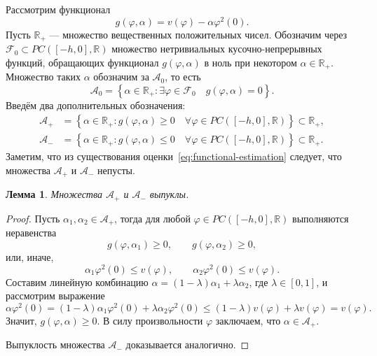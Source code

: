 \documentclass[a4paper,14pt]{article}
\newtheorem{lemma}{Лемма}
\theoremstyle{definition}
\begin{document}
Рассмотрим функционал
\begin{equation*}
  g(\varphi, \alpha) = v(\varphi) - \alpha \varphi^2(0).
\end{equation*}
Пусть $\mathbb{R}_+$ --- множество вещественных положительных чисел.
Обозначим через $\mathcal{F}_0 \subset PC([-h, 0], \mathbb{R})$ множество нетривиальных
кусочно-непрерывных функций, обращающих функционал $g(\varphi, \alpha)$ в ноль при некотором
$\alpha \in \mathbb{R}_+$. Множество таких $\alpha$ обозначим за $\mathcal{A}_0$, то есть
\begin{equation*}
  \mathcal{A}_0 = \left\{
    \alpha \in \mathbb{R}_+: \exists \varphi \in \mathcal{F}_0 \quad g(\varphi, \alpha) = 0
  \right\}.
\end{equation*}
Введём два дополнительных обозначения:
\begin{equation*}
  \begin{aligned}
    \mathcal{A}_+
    &=
      \left\{
      \alpha \in \mathbb{R}_+ :
      g(\varphi, \alpha) \geqslant 0 \quad \forall \varphi \in PC([-h, 0], \mathbb{R})
      \right\} \subset \mathbb{R}_+, \\
    \mathcal{A}_-
    &=
      \left\{
      \alpha \in \mathbb{R}_+ :
      g(\varphi, \alpha) \leqslant 0 \quad \forall \varphi \in PC([-h, 0], \mathbb{R})
      \right\} \subset \mathbb{R}_+.
  \end{aligned}
\end{equation*}
Заметим, что из существования оценки~\eqref{eq:functional-estimation} следует, что
множества $\mathcal{A}_+$ и $\mathcal{A}_-$ непусты.

\begin{lemma}
  Множества $\mathcal{A}_+$ и $\mathcal{A}_-$ выпуклы.
\end{lemma}

\begin{proof}
  Пусть $\alpha_1, \alpha_2 \in \mathcal{A}_+$, тогда для любой
  $\varphi \in PC([-h, 0], \mathbb{R})$ выполняются неравенства
  \begin{equation*}
      g(\varphi, \alpha_1) \geqslant 0, \qquad
      g(\varphi, \alpha_2) \geqslant 0,
  \end{equation*}
  или, иначе,
  \begin{equation*}
    \alpha_1 \varphi^2(0) \leqslant v(\varphi),
    \qquad
    \alpha_2 \varphi^2(0) \leqslant v(\varphi).
  \end{equation*}
  Составим линейную комбинацию $\alpha = (1 - \lambda) \alpha_1 + \lambda \alpha_2$,
  где $\lambda \in [0, 1]$, и рассмотрим выражение
  \begin{equation*}
    \alpha \varphi^2(0)
    =
    (1 - \lambda) \alpha_1 \varphi^2(0) + \lambda \alpha_2 \varphi^2(0)
    \leqslant
    (1 - \lambda) v(\varphi) + \lambda v(\varphi)
    = v(\varphi).
  \end{equation*}
  Значит, $g(\varphi, \alpha) \geqslant 0$. В силу произвольности $\varphi$ заключаем,
  что $\alpha \in \mathcal{A}_+$.

  Выпуклость множества $\mathcal{A}_-$ доказывается аналогично.
\end{proof}
\end{document}
